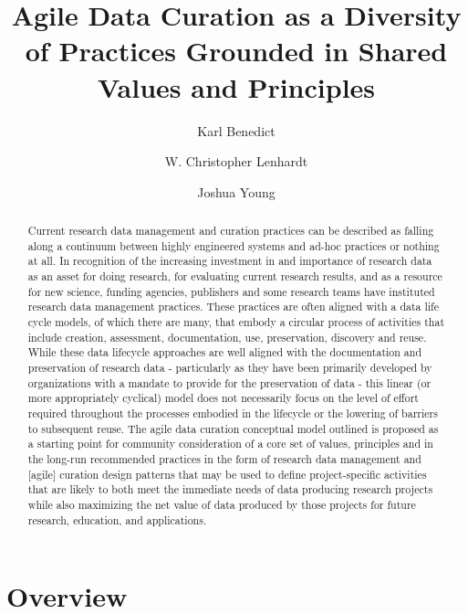 \documentclass[paper]{ijdc-v9}
\title[Agile Data Curation]{Agile Data Curation as a Diversity of Practices Grounded in Shared
Values and Principles}
\author{Karl Benedict}
\affil{University of New Mexico}
\author{W. Christopher Lenhardt}
\affil{Renaissance Computing Institute}
\author{Joshua Young}
\affil{University Corporation for Atmospheric Research}
\begin{document}
\maketitle

\begin{abstract}
Current research data management and curation practices can be described
as falling along a continuum between highly engineered systems and
ad-hoc practices or nothing at all. In recognition of the increasing
investment in and importance of research data as an asset for doing
research, for evaluating current research results, and as a resource for
new science, funding agencies, publishers and some research teams have
instituted research data management practices. These practices are often
aligned with a data life cycle models, of which there are many, that
embody a circular process of activities that include creation,
assessment, documentation, use, preservation, discovery and reuse. While
these data lifecycle approaches are well aligned with the documentation
and preservation of research data - particularly as they have been
primarily developed by organizations with a mandate to provide for the
preservation of data - this linear (or more appropriately cyclical)
model does not necessarily focus on the level of effort required
throughout the processes embodied in the lifecycle or the lowering of
barriers to subsequent reuse. The agile data curation conceptual model
outlined is proposed as a starting point for community consideration of
a core set of values, principles and in the long-run recommended
practices in the form of research data management and {[}agile{]}
curation design patterns that may be used to define project-specific
activities that are likely to both meet the immediate needs of data
producing research projects while also maximizing the net value of data
produced by those projects for future research, education, and
applications.
\end{abstract}

\section{Overview}\label{overview}
\end{document}
